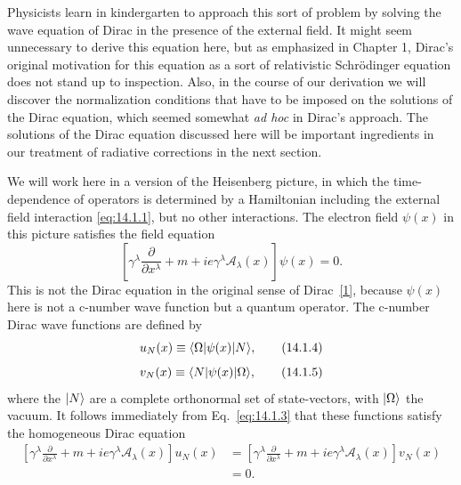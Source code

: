 Physicists learn in kindergarten to approach this sort of problem by solving
the wave equation of Dirac in the presence of the external field. It might seem
unnecessary to derive this equation here, but as emphasized in Chapter 1,
Dirac's original motivation for this equation as a sort of relativistic
Schr\"odinger equation does not stand up to inspection. Also, in the course of
our derivation we will discover the normalization conditions that have to be
imposed on the solutions of the Dirac equation, which seemed somewhat
\emph{ad hoc} in Dirac's approach. The solutions of the Dirac equation
discussed here will be important ingredients in our treatment of radiative
corrections in the next section.

We will work here in a version of the Heisenberg picture, in which the
time-dependence of operators is determined by a Hamiltonian including the
external field interaction \eqref{eq:14.1.1}, but no other interactions. The
electron field $\psi(x)$ in this picture satisfies the field equation
\begin{equation}
  \left[\gamma^\lambda\frac{\partial}{\partial x^\lambda}
  +m+ie\gamma^\lambda\mathcal A_\lambda(x)\right]\psi(x)=0.
  \tag{14.1.3}\label{eq:14.1.3}
\end{equation}
This is not the Dirac equation in the original sense of
Dirac~\hyperlink{ref:14.1}{[1]}, because $\psi(x)$ here is not a c-number wave
function but a quantum operator. The c-number Dirac wave functions are defined
by
\begin{equation}
  u_N(x)\equiv\langle \Omega\rvert\psi(x)\lvert N\rangle,
  \tag{14.1.4}\label{eq:14.1.4}
\end{equation}
\begin{equation}
  v_N(x)\equiv\langle N\rvert\psi(x)\lvert \Omega\rangle,
  \tag{14.1.5}\label{eq:14.1.5}
\end{equation}
where the $\lvert N\rangle$ are a complete orthonormal set of state-vectors, with
$\lvert \Omega\rangle$ the vacuum. It follows immediately from Eq.~\eqref{eq:14.1.3}
that these functions satisfy the homogeneous Dirac equation
\begin{equation}
\begin{aligned}
\left[\gamma^\lambda\frac{\partial}{\partial x^\lambda}
 +m+ie\gamma^\lambda\mathcal A_\lambda(x)\right]u_N(x)
&=\left[\gamma^\lambda\frac{\partial}{\partial x^\lambda}
 +m+ie\gamma^\lambda\mathcal A_\lambda(x)\right]v_N(x)\\
&=0.
\end{aligned}
\tag{14.1.6}\label{eq:14.1.6}
\end{equation}
